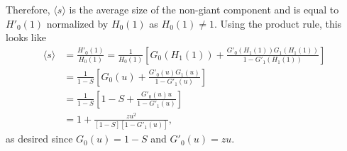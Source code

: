 \documentclass{letter}
\begin{document}
{    Therefore, $\langle s \rangle$ is the average size of the non-giant component and is equal to $H'_0(1)$ normalized by $H_0(1)$ as $H_0(1) \neq 1$. Using the product rule, this looks like \begin{align*}
        \langle s \rangle &= \frac{H'_0(1)}{H_0(1)} = \frac{1}{H_0(1)}\left[G_0(H_1(1)) + \frac{G'_0(H_1(1))G_1(H_1(1))}{1 - G'_1(H_1(1))}\right] \\
        &= \frac{1}{1 - S}\left[G_0(u) + \frac{G'_0(u)G_1(u)}{1 - G'_1(u)}\right] \\
        &= \frac{1}{1 - S}\left[1 - S + \frac{G'_0(u)u}{1 - G'_1(u)}\right] \\
        &= 1 + \frac{zu^2}{[1 - S][1 - G'_1(u)]},
    \end{align*} as desired since $G_0(u) = 1 - S$ and $G'_0(u) = zu$.}
\end{document}
